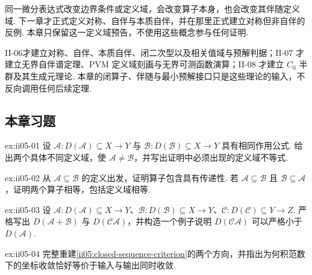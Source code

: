 \begin{FARemark}[对称但非自伴的反例的定义域预告]
同一微分表达式改变边界条件或定义域，会改变算子本身，也会改变其伴随定义域. 下一章才正式定义对称、自伴与本质自伴，并在那里正式建立对称但非自伴的反例. 本章只保留这一定义域预告，不使用这些概念参与任何证明.
\end{FARemark}

\begin{FARemark}[后续章节边界]
II-06才建立对称、自伴、本质自伴、闭二次型以及相关值域与预解判据；II-07 才建立无界自伴谱定理、PVM 定义域刻画与无界可测函数演算；II-08 才建立 \(\displaystyle C_0\) 半群及其生成元理论. 本章的闭算子、伴随与最小预解接口只是这些理论的输入，不反向调用任何后续定理.
\end{FARemark}

\subsection*{本章习题}\label{sec:ii05-exercises}

\begin{FAExercise}[算子相等与定义域]{ex:ii05-01}
设 \(\displaystyle\mathcal A:D(\mathcal A)\subseteq X\to Y\) 与 \(\displaystyle\mathcal B:D(\mathcal B)\subseteq X\to Y\) 具有相同作用公式. 给出两个具体不同定义域，使 \(\displaystyle\mathcal A\neq\mathcal B\)，并写出证明中必须出现的定义域不等式.
\end{FAExercise}

\begin{FAExercise}[延拓与限制]{ex:ii05-02}
从 \(\displaystyle\mathcal A\subseteq\mathcal B\) 的定义出发，证明算子包含具有传递性. 若 \(\displaystyle\mathcal A\subseteq\mathcal B\) 且 \(\displaystyle\mathcal B\subseteq\mathcal A\)，证明两个算子相等，包括定义域相等.
\end{FAExercise}

\begin{FAExercise}[和与复合的定义域]{ex:ii05-03}
设 \(\displaystyle\mathcal A:D(\mathcal A)\subseteq X\to Y\)、\(\displaystyle\mathcal B:D(\mathcal B)\subseteq X\to Y\)、\(\displaystyle\mathcal C:D(\mathcal C)\subseteq Y\to Z\). 严格写出 \(\displaystyle D(\mathcal A+\mathcal B)\) 与 \(\displaystyle D(\mathcal C\mathcal A)\)，并构造一个例子说明 \(\displaystyle D(\mathcal C\mathcal A)\) 可以严格小于 \(\displaystyle D(\mathcal A)\).
\end{FAExercise}

\begin{FAExercise}[闭图的序列判据]{ex:ii05-04}
完整重建\autoref{ii05:closed-sequence-criterion}的两个方向，并指出为何积范数下的坐标收敛恰好等价于输入与输出同时收敛.
\end{FAExercise}

